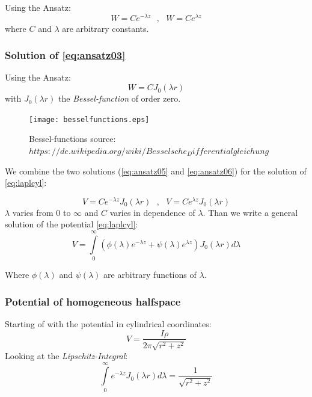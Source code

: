 Using the Ansatz:
\begin{equation}
W=Ce^{-\lambda z}~~~,~~~ W=Ce^{\lambda z} \label{eq:ansatz05}
\end{equation}
where $C$ and $\lambda$ are arbitrary constants.
\subsubsection*{Solution of \eqref{eq:ansatz03}}

Using the Ansatz:
\begin{equation}
W=C J_0(\lambda r) \label{eq:ansatz06}
\end{equation}
with $J_0(\lambda r)$ the \textit{Bessel-function} of order zero.

\begin{figure}[h!]
\begin{center}
\texttt{[image: besselfunctions.eps]}
\caption{Bessel-functions source: $ https://de.wikipedia.org/wiki/Besselsche_Differentialgleichung$}
\label{fig:besself}
\end{center}
\end{figure}

We combine the two solutions (\eqref{eq:ansatz05} and \eqref{eq:ansatz06}) for the solution of \eqref{eq:laplcyl}:

\begin{equation}
V=Ce^{-\lambda z}J_0(\lambda r) ~~~,~~~ V=Ce^{\lambda z}J_0(\lambda r) \label{eq:ansatz07}
\end{equation}
$\lambda$ varies from $0$ to $\infty$ and $C$ varies in dependence of $\lambda$. Than we write a general solution of the potential \eqref{eq:laplcyl}:
\begin{equation}
V=\int\limits_{0}^{\infty}\left(\phi(\lambda)e^{-\lambda z}+\psi(\lambda)e^{\lambda z}\right)J_0(\lambda r) d\lambda \label{eq:sol-lapleq}
\end{equation}

Where $\phi(\lambda)$ and $\psi(\lambda)$ are arbitrary functions of $\lambda$.

\subsubsection*{Potential of homogeneous halfspace}
Starting of with the potential in cylindrical coordinates:
\begin{equation}
V=\frac{I\rho}{2\pi\sqrt{r^2+z^2}}\label{eq:2-20}
\end{equation}
Looking at the \textit{Lipschitz-Integral}:
\begin{equation}
\int\limits_{0}^{\infty}e^{-\lambda z}J_0(\lambda r)d\lambda=\frac{1}{\sqrt{r^2+z^2}} \label{eq:lipschitzint}
\end{equation}

